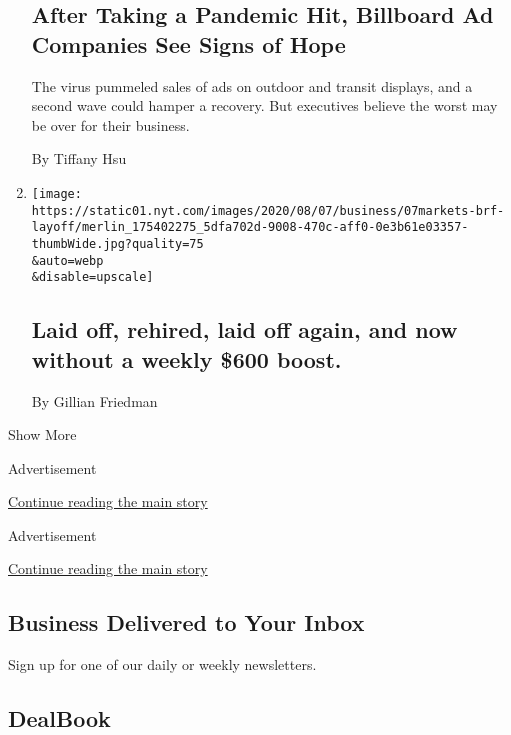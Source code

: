 \begin{enumerate}
  \hypertarget{after-taking-a-pandemic-hit-billboard-ad-companies-see-signs-of-hope}{%
  \subsection{After Taking a Pandemic Hit, Billboard Ad Companies See
  Signs of
  Hope}\label{after-taking-a-pandemic-hit-billboard-ad-companies-see-signs-of-hope}}

  The virus pummeled sales of ads on outdoor and transit displays, and a
  second wave could hamper a recovery. But executives believe the worst
  may be over for their business.

  By Tiffany Hsu
\item
  \href{/2020/08/07/business/laid-off-rehired-laid-off-again-and-now-without-a-weekly-600-boost.html}{}

  \texttt{[image: https://static01.nyt.com/images/2020/08/07/business/07markets-brf-layoff/merlin\_175402275\_5dfa702d-9008-470c-aff0-0e3b61e03357-thumbWide.jpg?quality=75\\\&auto=webp\\\&disable=upscale]}

  \hypertarget{laid-off-rehired-laid-off-again-and-now-without-a-weekly-600-boost}{%
  \subsection{Laid off, rehired, laid off again, and now without a
  weekly \$600
  boost.}\label{laid-off-rehired-laid-off-again-and-now-without-a-weekly-600-boost}}

  By Gillian Friedman
\end{enumerate}

Show More

Advertisement

\protect\hyperlink{after-mid2}{Continue reading the main story}

Advertisement

\protect\hyperlink{after-mktg}{Continue reading the main story}

\hypertarget{business-delivered-to-your-inbox}{%
\subsection{Business Delivered to Your
Inbox}\label{business-delivered-to-your-inbox}}

Sign up for one of our daily or weekly newsletters.

\hypertarget{dealbook}{%
\subsection{DealBook}\label{dealbook}}

